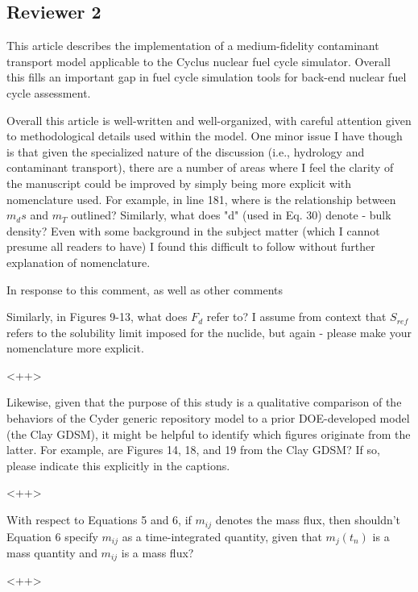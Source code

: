 \documentclass[answers,12pt]{exam}
\begin{document}
\begin{questions}
\section*{Reviewer 2}

\question This article describes the implementation of a medium-fidelity contaminant transport model applicable to the Cyclus nuclear fuel cycle simulator. Overall this fills an important gap in fuel cycle simulation tools for back-end nuclear fuel cycle assessment.

Overall this article is well-written and well-organized, with careful attention given to methodological details used within the model. One minor issue I have though is that given the specialized nature of the discussion (i.e., hydrology and contaminant transport), there are a number of areas where I feel the clarity of the manuscript could be improved by simply being more explicit with nomenclature used. For example, in line 181, where is the relationship between $m_ds$ and $m_T$ outlined? Similarly, what does "d" (used in Eq. 30) denote - bulk density? Even with some background in the subject matter (which I cannot presume all readers to have) I found this difficult to follow without further explanation of nomenclature.
\begin{solution}
In response to this comment, as well as other comments 
\end{solution}

\question Similarly, in Figures 9-13, what does $F_d$ refer to? I assume from 
context that $S_{ref}$ refers to the solubility limit imposed for the nuclide, but again - please make your nomenclature more explicit. 
\begin{solution}
<++>
\end{solution}

\question Likewise, given that the purpose of this study is a qualitative comparison of the behaviors of the Cyder generic repository model to a prior DOE-developed model (the Clay GDSM), it might be helpful to identify which figures originate from the latter. For example, are Figures 14, 18, and 19 from the Clay GDSM? If so, please indicate this explicitly in the captions. 
\begin{solution}
<++>
\end{solution}

\question With respect to Equations 5 and 6, if $m_{ij}$ denotes the mass flux, 
then shouldn't Equation 6 specify $m_{ij}$ as a time-integrated quantity, given 
that $m_j(t_n)$ is a mass quantity and $m_{ij}$ is a mass flux?
\begin{solution}
<++>
\end{solution}


\end{questions}
\end{document}
